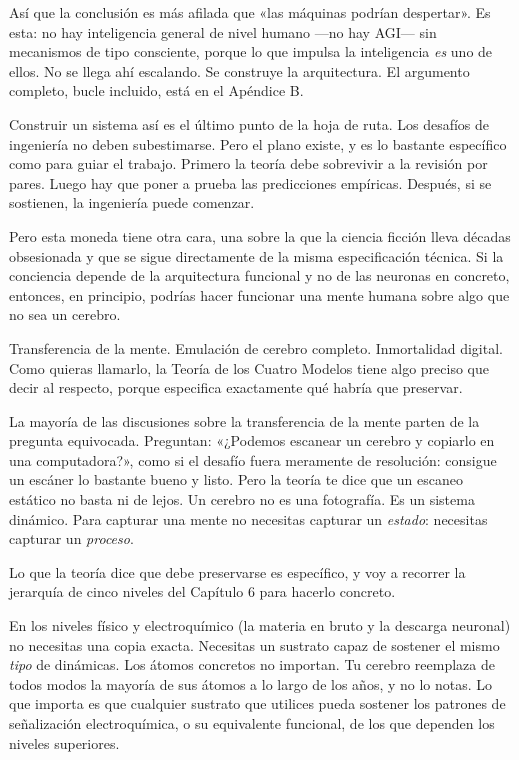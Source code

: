 \documentclass[11pt, twoside, openright]{book}
\begin{document}
Así que la conclusión es más afilada que «las máquinas podrían despertar». Es esta: no hay inteligencia general de nivel humano ---no hay AGI--- sin mecanismos de tipo consciente, porque lo que impulsa la inteligencia \textit{es} uno de ellos. No se llega ahí escalando. Se construye la arquitectura. El argumento completo, bucle incluido, está en el Apéndice B.

Construir un sistema así es el último punto de la hoja de ruta. Los desafíos de ingeniería no deben subestimarse. Pero el plano existe, y es lo bastante específico como para guiar el trabajo. Primero la teoría debe sobrevivir a la revisión por pares. Luego hay que poner a prueba las predicciones empíricas. Después, si se sostienen, la ingeniería puede comenzar.


Pero esta moneda tiene otra cara, una sobre la que la ciencia ficción lleva décadas obsesionada y que se sigue directamente de la misma especificación técnica. Si la conciencia depende de la arquitectura funcional y no de las neuronas en concreto, entonces, en principio, podrías hacer funcionar una mente humana sobre algo que no sea un cerebro.

Transferencia de la mente. Emulación de cerebro completo. Inmortalidad digital. Como quieras llamarlo, la Teoría de los Cuatro Modelos tiene algo preciso que decir al respecto, porque especifica exactamente qué habría que preservar.

La mayoría de las discusiones sobre la transferencia de la mente parten de la pregunta equivocada. Preguntan: «¿Podemos escanear un cerebro y copiarlo en una computadora?», como si el desafío fuera meramente de resolución: consigue un escáner lo bastante bueno y listo. Pero la teoría te dice que un escaneo estático no basta ni de lejos. Un cerebro no es una fotografía. Es un sistema dinámico. Para capturar una mente no necesitas capturar un \textit{estado}: necesitas capturar un \textit{proceso}.

Lo que la teoría dice que debe preservarse es específico, y voy a recorrer la jerarquía de cinco niveles del Capítulo 6 para hacerlo concreto.

En los niveles físico y electroquímico (la materia en bruto y la descarga neuronal) no necesitas una copia exacta. Necesitas un sustrato capaz de sostener el mismo \textit{tipo} de dinámicas. Los átomos concretos no importan. Tu cerebro reemplaza de todos modos la mayoría de sus átomos a lo largo de los años, y no lo notas. Lo que importa es que cualquier sustrato que utilices pueda sostener los patrones de señalización electroquímica, o su equivalente funcional, de los que dependen los niveles superiores.
\end{document}
